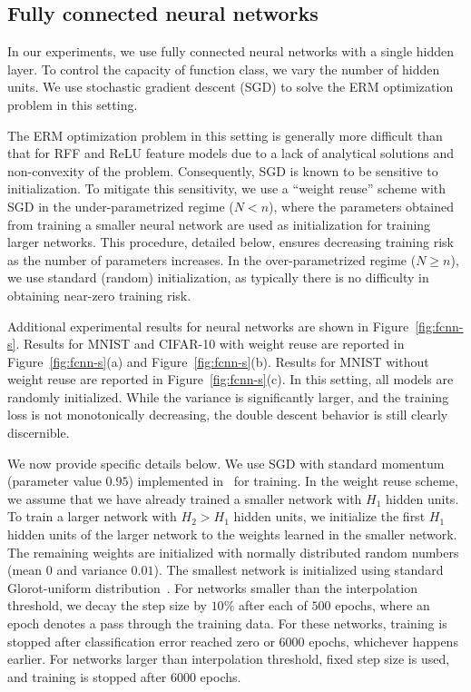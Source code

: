 \documentclass[11pt]{article}
\begin{document}
\subsection{Fully connected neural networks}\label{app:FNN}

In our experiments, we use fully connected neural networks with a single hidden layer.
To control the capacity of function class, we vary the number of hidden units.
We use stochastic gradient descent (SGD) to solve the ERM optimization problem in this setting.

The ERM optimization problem in this setting is generally more difficult than that for RFF and ReLU feature models due to a lack of analytical solutions and non-convexity of the problem.
Consequently, SGD is known to be sensitive to initialization.
To mitigate this sensitivity, we use a ``weight reuse'' scheme with SGD in the under-parametrized regime ($N < n$), where the parameters obtained from training a smaller neural network are used as initialization for training larger networks.
This procedure, detailed below, ensures decreasing training risk as the number of parameters increases. 
In the over-parametrized regime ($N \geq n$), we use standard (random) initialization, as typically there is no difficulty in obtaining near-zero training risk. 

Additional experimental results for neural networks are shown in Figure~\ref{fig:fcnn-s}. Results for MNIST and CIFAR-10 with weight reuse are reported in Figure~\ref{fig:fcnn-s}(a) and Figure~\ref{fig:fcnn-s}(b). Results for MNIST without weight reuse are reported in Figure~\ref{fig:fcnn-s}(c). In this setting, all models are randomly initialized. While the variance is significantly larger, and the training loss is not monotonically decreasing, the double descent behavior is still clearly discernible.

We now provide specific details below. We use SGD with standard momentum (parameter value $0.95$) implemented in~\cite{chollet2015keras} for training.
In the weight reuse scheme, we assume that we have already trained a smaller network with $H_1$ hidden units. To train a larger network with $H_2>H_1$ hidden units, we initialize the first $H_1$ hidden units of the larger network to the weights learned in the smaller network. The remaining weights are initialized with normally distributed random numbers (mean $0$ and variance $0.01$). The smallest network is initialized using standard Glorot-uniform distribution~\cite{glorot2010understanding}. For networks smaller than the interpolation threshold, we decay the step size by $10\%$ after each of $500$ epochs, where an epoch denotes a pass through the training data.
For these networks, training is stopped after classification error reached zero or $6000$ epochs, whichever happens earlier. For networks larger than interpolation threshold, fixed step size is used, and training is stopped after $6000$ epochs.
\end{document}
